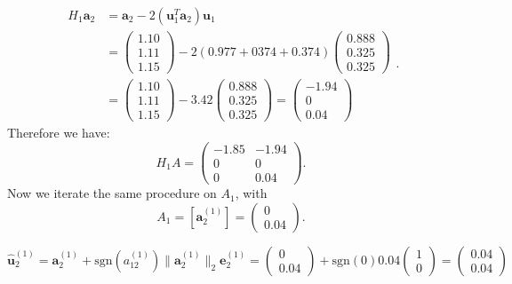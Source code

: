 \documentclass[a4paper,11pt]{article}
\begin{document}
\begin{equation}\label{key}
	\begin{split}
		H_1 \textbf{a}_2 &= \textbf{a}_2 - 2 (\textbf{u}_1^T\textbf{a}_2) \textbf{u}_1  \\
		&= \begin{pmatrix}
			1.10\\
			1.11\\
			1.15
		\end{pmatrix} - 2(0.977 + 0374 + 0.374) \begin{pmatrix}
		0.888\\
		0.325\\
		0.325
	\end{pmatrix} \\
	&= \begin{pmatrix}
		1.10\\
		1.11\\
		1.15
	\end{pmatrix} - 3.42 \begin{pmatrix}
		0.888\\
		0.325\\
		0.325
	\end{pmatrix} = \begin{pmatrix}
	-1.94\\
	0\\
	0.04
\end{pmatrix}
	\end{split} .
\end{equation}
Therefore we have:
\begin{equation}\label{key}
	H_1 A = \begin{pmatrix}
		-1.85& -1.94 \\
		0& 0  \\
		0& 0.04
	\end{pmatrix}. 
\end{equation}
Now we iterate the same procedure on $A_1$, with
\begin{equation}\label{key}
	A_1 = [\textbf{a}_2^{(1)}] = \begin{pmatrix}
		0\\
		0.04
	\end{pmatrix}.
\end{equation}


\begin{equation}\label{key}
	\hat{\textbf{u}}_2^{(1)} = \textbf{a}_2^{(1)} + \text{sgn}(a_{12}^{(1)}) \lVert \textbf{a}_2^{(1)} \rVert_2\textbf{e}_2^{(1)} = \begin{pmatrix}
		0\\
		0.04
	\end{pmatrix}+ \text{sgn}(0) 0.04 \begin{pmatrix}
		1\\
		0
	\end{pmatrix} = \begin{pmatrix}
		0.04\\
		0.04
	\end{pmatrix}
\end{equation}
\end{document}
